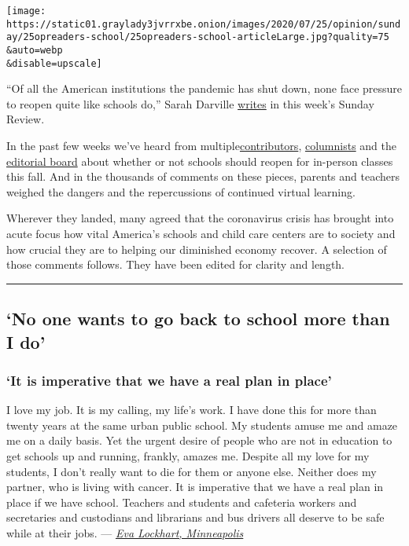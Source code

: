 \texttt{[image: https://static01.graylady3jvrrxbe.onion/images/2020/07/25/opinion/sunday/25opreaders-school/25opreaders-school-articleLarge.jpg?quality=75\\\&auto=webp\\\&disable=upscale]}

``Of all the American institutions the pandemic has shut down, none face
pressure to reopen quite like schools do,'' Sarah Darville
\href{https://www.nytimes3xbfgragh.onion/2020/07/23/sunday-review/reopening-schools-coronavirus.html}{writes}
in this week's Sunday Review.

In the past few weeks we've heard from
multiple\href{https://www.nytimes3xbfgragh.onion/2020/07/18/opinion/sunday/covid-schools-reopen-teacher-safety.html}{contributors},
\href{https://www.nytimes3xbfgragh.onion/2020/07/15/opinion/schools-reopening.html}{columnists}
and the
\href{https://www.nytimes3xbfgragh.onion/2020/07/10/opinion/coronavirus-schools-reopening.html}{editorial
board} about whether or not schools should reopen for in-person classes
this fall. And in the thousands of comments on these pieces, parents and
teachers weighed the dangers and the repercussions of continued virtual
learning.

Wherever they landed, many agreed that the coronavirus crisis has
brought into acute focus how vital America's schools and child care
centers are to society and how crucial they are to helping our
diminished economy recover. A selection of those comments follows. They
have been edited for clarity and length.

\begin{center}\rule{0.5\linewidth}{\linethickness}\end{center}

\hypertarget{no-one-wants-to-go-back-to-school-more-than-i-do}{%
\subsection{`No one wants to go back to school more than I
do'}\label{no-one-wants-to-go-back-to-school-more-than-i-do}}

\hypertarget{it-is-imperative-that-we-have-a-real-plan-in-place}{%
\subsubsection{\texorpdfstring{\textbf{`It is imperative that we have a
real plan in
place'}}{`It is imperative that we have a real plan in place'}}\label{it-is-imperative-that-we-have-a-real-plan-in-place}}

I love my job. It is my calling, my life's work. I have done this for
more than twenty years at the same urban public school. My students
amuse me and amaze me on a daily basis. Yet the urgent desire of people
who are not in education to get schools up and running, frankly, amazes
me. Despite all my love for my students, I don't really want to die for
them or anyone else. Neither does my partner, who is living with cancer.
It is imperative that we have a real plan in place if we have school.
Teachers and students and cafeteria workers and secretaries and
custodians and librarians and bus drivers all deserve to be safe while
at their jobs. ---
\href{https://nyti.ms/3gSauxs\#permid=108077824}{\emph{Eva Lockhart,
Minneapolis}}

